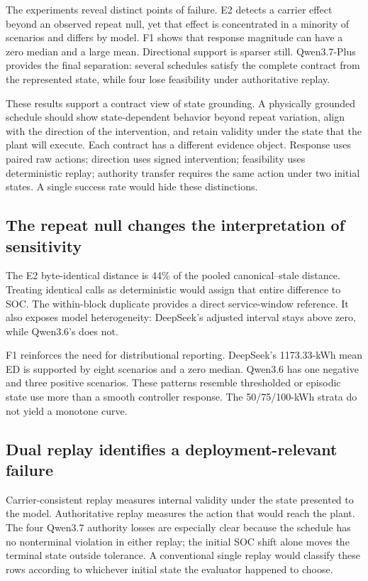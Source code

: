 \documentclass[11pt]{article}
\begin{document}
The experiments reveal distinct points of failure. E2 detects a carrier effect beyond an observed
repeat null, yet that effect is concentrated in a minority of scenarios and differs by model.
F1 shows that response magnitude can have a zero median and a large mean. Directional support is
sparser still. Qwen3.7-Plus provides the final separation: several schedules satisfy the complete
contract from the represented state, while four lose feasibility under authoritative replay.

These results support a contract view of state grounding. A physically grounded schedule should
show state-dependent behavior beyond repeat variation, align with the direction of the
intervention, and retain validity under the state that the plant will execute. Each contract has a
different evidence object. Response uses paired raw actions; direction uses signed intervention;
feasibility uses deterministic replay; authority transfer requires the same action under two
initial states. A single success rate would hide these distinctions.

\subsection{The repeat null changes the interpretation of sensitivity}

The E2 byte-identical distance is 44\% of the pooled canonical--stale distance. Treating identical
calls as deterministic would assign that entire difference to SOC. The within-block duplicate
provides a direct service-window reference. It also exposes model heterogeneity: DeepSeek's
adjusted interval stays above zero, while Qwen3.6's does not.

F1 reinforces the need for distributional reporting. DeepSeek's 1173.33-kWh mean ED is supported
by eight scenarios and a zero median. Qwen3.6 has one negative and three positive scenarios. These
patterns resemble thresholded or episodic state use more than a smooth controller response. The
50/75/100-kWh strata do not yield a monotone curve.

\subsection{Dual replay identifies a deployment-relevant failure}

Carrier-consistent replay measures internal validity under the state presented to the model.
Authoritative replay measures the action that would reach the plant. The four Qwen3.7 authority
losses are especially clear because the schedule has no nonterminal violation in either replay;
the initial SOC shift alone moves the terminal state outside tolerance. A conventional single
replay would classify these rows according to whichever initial state the evaluator happened to
choose.
\end{document}
